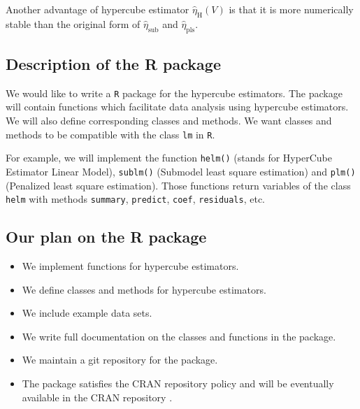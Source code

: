 \documentclass[draft]{article}
\begin{document}
Another advantage of hypercube estimator $\hat{\eta}_\text{H} (V)$ is that it is more numerically stable than the original form of $\hat{\eta}_\text{sub}$ and $\hat{\eta}_\text{pls}$.

\subsection{Description of the R package}

We would like to write a {\tt R} package for the hypercube estimators. The package will contain functions which facilitate data analysis using hypercube estimators. We will also define corresponding classes and methods. We want classes and methods to be compatible with the class {\tt lm} in {\tt R}.

For example, we will implement the function \texttt{helm()} (stands for HyperCube Estimator Linear Model), \texttt{sublm()} (Submodel least square estimation) and \texttt{plm()} (Penalized least square estimation). Those functions return variables of the class {\tt helm} with methods {\tt summary}, {\tt predict}, {\tt coef}, {\tt residuals}, etc.

\subsection{Our plan on the R package}

\begin{itemize}

	\item We implement functions for hypercube estimators.

	\item We define classes and methods for hypercube estimators.

	\item We include example data sets.

	\item We write full documentation on the classes and functions in the package.

	\item We maintain a git repository for the package.

	\item The package satisfies the CRAN repository policy and will be eventually available in the CRAN repository .

\end{itemize}
\end{document}
